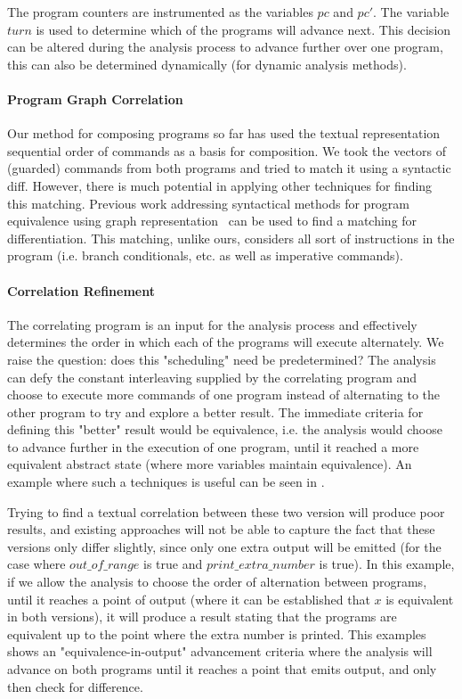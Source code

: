 

The program counters are instrumented as the variables $pc$ and $pc'$. The variable $turn$ is used to determine which of the programs will advance next. This decision can be altered during the analysis process to advance further over one program, this can also be determined dynamically (for dynamic analysis methods).

\paragraph{Program Graph Correlation}
Our method for composing programs so far has used the textual representation sequential order of commands as a basis for composition. We took the vectors of (guarded) commands from both programs and tried to match it using a syntactic diff. However, there is much potential in applying other techniques for finding this matching. Previous work addressing syntactical methods for program equivalence using graph representation~\cite{Horwitz89,Horwitz90} can be used to find a matching for differentiation. This matching, unlike ours, considers all sort of instructions in the program (i.e. branch conditionals, etc. as well as imperative commands).

\paragraph{Correlation Refinement} The correlating program is an input for the analysis process and effectively determines the order in which each of the programs will execute alternately. We raise the question: does this "scheduling" need be predetermined? The analysis can defy the constant interleaving supplied by the correlating program and choose to execute more commands of one program instead of alternating to the other program to try and explore a better result. The immediate criteria for defining this "better" result would be equivalence, i.e. the analysis would choose to advance further in the execution of one program, until it reached a more equivalent abstract state (where more variables maintain equivalence). An example where such a techniques is useful can be seen in .



Trying to find a textual correlation between these two version will produce poor results, and existing approaches will not be able to capture the fact that these versions only differ slightly, since only one extra output will be emitted (for the case where $out\_of\_range$ is true and $print\_extra\_number$ is true). In this example, if we allow the analysis to choose the order of alternation between programs, until it reaches a point of output (where it can be established that $x$ is equivalent in both versions), it will produce a result stating that the programs are equivalent up to the point where the extra number is printed. This examples shows an "equivalence-in-output" advancement criteria where the analysis will advance on both programs until it reaches a point that emits output, and only then check for difference.

